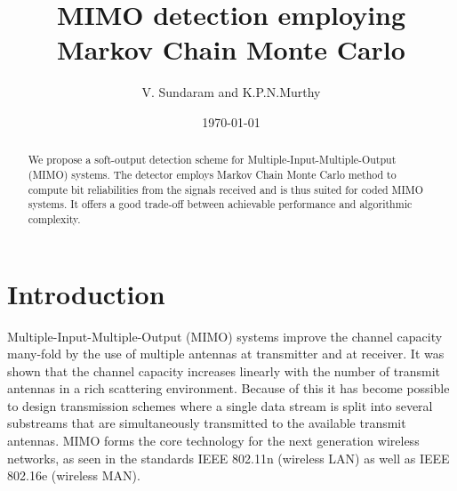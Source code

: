 \documentclass[pre,12pt,aps]{revtex4}
\begin{document}
\title{MIMO detection employing Markov Chain Monte Carlo}
\author{ V. Sundaram and K.P.N.Murthy}
            
\date{\today}
\begin{abstract}
We propose a soft-output detection scheme for 
Multiple-Input-Multiple-Output (MIMO) systems. 
The detector employs Markov Chain Monte Carlo  method to compute 
bit reliabilities from the signals received 
and is thus suited for coded MIMO systems. 
It offers a good trade-off between achievable performance 
and algorithmic complexity.
\end{abstract}
\maketitle
\section{Introduction}
Multiple-Input-Multiple-Output (MIMO) systems improve 
the channel capacity many-fold by the use of multiple 
antennas at transmitter and at receiver\cite{gjf,vtnsarc}. 
It was shown \cite{gjf} that the channel capacity 
increases linearly with the number of transmit antennas 
in a rich scattering environment. Because of this 
it has become possible to 
design transmission schemes where 
a single data stream is split into several substreams 
that are simultaneously transmitted to the available 
transmit antennas. MIMO forms the core technology for 
the next generation wireless networks, as seen in 
the standards IEEE 802.11n (wireless LAN) 
as well as IEEE 802.16e (wireless MAN).
\end{document}
